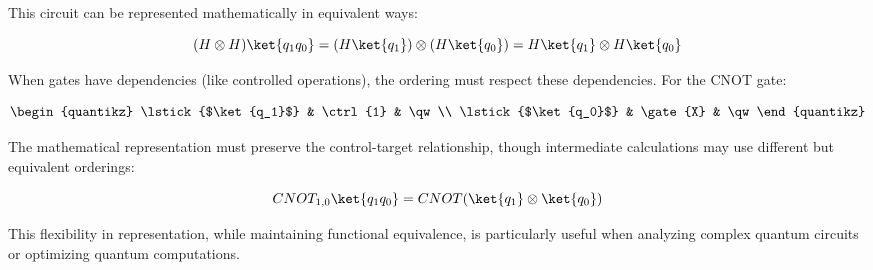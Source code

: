 This circuit can be represented mathematically in equivalent ways:

\[
  (H \otimes H)\ket{q_1q_0} = (H\ket{q_1}) \otimes (H\ket{q_0}) = H\ket{q_1}
  \otimes H\ket{q_0}
\]

\noindent
When gates have dependencies (like controlled operations), the ordering must
respect these dependencies. For the CNOT gate:

\begin{align*}
  \begin{quantikz}
    \lstick{$\ket{q_1}$} & \ctrl{1} & \qw \\
    \lstick{$\ket{q_0}$} & \gate{X} & \qw
  \end{quantikz}
\end{align*}

\noindent
The mathematical representation must preserve the control-target
relationship, though intermediate calculations may use different but
equivalent orderings:

\[
  CNOT_{1,0}\ket{q_1q_0} = CNOT(\ket{q_1} \otimes \ket{q_0})
\]

This flexibility in representation, while maintaining functional equivalence,
is particularly useful when analyzing complex quantum circuits or optimizing
quantum computations.

